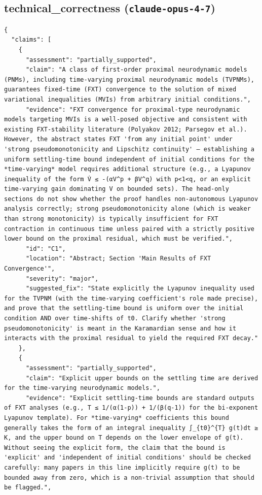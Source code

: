 \documentclass[11pt]{article}
\begin{document}
\subsection*{technical_correctness (\texttt{claude-opus-4-7})}
\begin{verbatim}
{
  "claims": [
    {
      "assessment": "partially_supported",
      "claim": "A class of first-order proximal neurodynamic models (PNMs), including time-varying proximal neurodynamic models (TVPNMs), guarantees fixed-time (FXT) convergence to the solution of mixed variational inequalities (MVIs) from arbitrary initial conditions.",
      "evidence": "FXT convergence for proximal-type neurodynamic models targeting MVIs is a well-posed objective and consistent with existing FXT-stability literature (Polyakov 2012; Parsegov et al.). However, the abstract states FXT 'from any initial point' under 'strong pseudomonotonicity and Lipschitz continuity' — establishing a uniform settling-time bound independent of initial conditions for the *time-varying* model requires additional structure (e.g., a Lyapunov inequality of the form V̇ ≤ -(αV^p + βV^q) with p<1<q, or an explicit time-varying gain dominating V on bounded sets). The head-only sections do not show whether the proof handles non-autonomous Lyapunov analysis correctly; strong pseudomonotonicity alone (which is weaker than strong monotonicity) is typically insufficient for FXT contraction in continuous time unless paired with a strictly positive lower bound on the proximal residual, which must be verified.",
      "id": "C1",
      "location": "Abstract; Section 'Main Results of FXT Convergence'",
      "severity": "major",
      "suggested_fix": "State explicitly the Lyapunov inequality used for the TVPNM (with the time-varying coefficient's role made precise), and prove that the settling-time bound is uniform over the initial condition AND over time-shifts of t0. Clarify whether 'strong pseudomonotonicity' is meant in the Karamardian sense and how it interacts with the proximal residual to yield the required FXT decay."
    },
    {
      "assessment": "partially_supported",
      "claim": "Explicit upper bounds on the settling time are derived for the time-varying neurodynamic models.",
      "evidence": "Explicit settling-time bounds are standard outputs of FXT analyses (e.g., T ≤ 1/(α(1-p)) + 1/(β(q-1)) for the bi-exponent Lyapunov template). For *time-varying* coefficients this bound generally takes the form of an integral inequality ∫_{t0}^{T} g(t)dt ≥ K, and the upper bound on T depends on the lower envelope of g(t). Without seeing the explicit form, the claim that the bound is 'explicit' and 'independent of initial conditions' should be checked carefully: many papers in this line implicitly require g(t) to be bounded away from zero, which is a non-trivial assumption that should be flagged.",

\end{verbatim}
\end{document}
